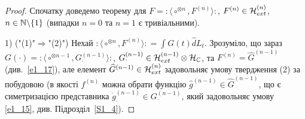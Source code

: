 \begin{proof}
Спочатку доведемо теорему для $F={:\!\langle}\circ^{\otimes n},F^{(n)}{\rangle\!:}$,
$F^{(n)}\in\mathcal{H}_{ext}^{(n)}$, $n\in\mathbb{N}\backslash\{1\}$ (випадки $n=0$ та $n=1$ є
тривіальними).

1) ("(1)"$\Rightarrow$"(2)") Нехай
${:\!\langle}\circ^{\otimes n},F^{(n)}{\rangle\!:}=\int G(t)\widehat dL_t$. Зрозуміло, що
зараз $G(\cdot)={:\!\langle}\circ^{\otimes n-1},G^{(n-1)}_\cdot{\rangle\!:}$,
$G^{(n-1)}_\cdot\in\mathcal{H}_{ext}^{(n-1)}\otimes\mathcal{H}_{\mathbb{C}}$,
та $F^{(n)}=\widehat G^{(n-1)}$ (див.~\eqref{e1_17}), але елемент
$\widehat G^{(n-1)}\in\mathcal{H}_{ext}^{(n)}$ задовольняє умову твердження (2) за побудовою
(в якості $f^{(n)}$ можна обрати функцію $\widehat g^{(n-1)}\in \widehat G^{(n-1)}$, що є
симетризацією представника $\dot g^{(n-1)}_\cdot\in G^{(n-1)}_\cdot$, який задовольняє умову
\eqref{e1_15}, див. Підрозділ~\ref{S1_4}).


\end{proof}
